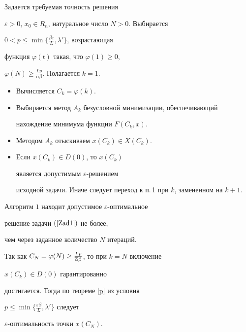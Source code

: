 \begin{alg}


Задается требуемая точность решения


$\varepsilon>0$, $x_0\in R_n$, натуральное число $N>0$. Выбирается


$0<p\leq\min\{\frac{\beta\varepsilon}{L},\lambda'\}$, возрастающая


функция $\varphi(t)$ такая, что $\varphi(1)\geq 0$,


$\varphi(N)\geq\frac{Lp}{\overline\alpha\beta}$. Полагается $k=1$.


\begin{itemize}


\item[1.] Вычисляется $C_k=\varphi(k)$.


\item[2.] Выбирается метод $A_k$ безусловной минимизации, обеспечивающий


нахождение минимума функции $F(C_k,x)$.


\item[3.] Методом $A_k$ отыскиваем $x(C_k)\in X(C_k)$.


\item[4.] Если $x(C_k)\in D(0)$, то $x(C_k)$ 


является допустимым $\varepsilon$-решением


исходной задачи. Иначе следует переход к п.\,1 при $k$, замененном на $k+1$.


\end{itemize}


\end{alg}





\begin{thm}


Алгоритм $1$ находит допустимое $\varepsilon$-оптимальное 


решение задачи $(\ref{Zad1})$ не более,


чем через заданное количество $N$ итераций.


\end{thm}





\begin{pf}


Так как $C_N=\varphi(N)\geq\frac{Lp}{\overline\alpha\beta}$, то при $k=N$ включение 


$x(C_k)\in D(0)$ гарантированно


достигается. Тогда по теореме \ref{p} из условия 


$p\leq\min\{\frac{\varepsilon\beta}{L},\lambda'\}$ следует


$\varepsilon$-оптимальность точки $x(C_N)$.


\end{pf}






